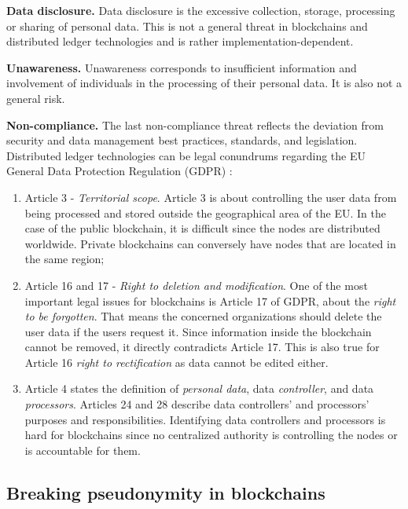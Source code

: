 \textbf{Data disclosure.} Data disclosure is the excessive collection, storage, processing or sharing of personal data.
This is not a general threat in blockchains and distributed ledger technologies and is rather implementation-dependent.

\textbf{Unawareness.} Unawareness corresponds to insufficient information and involvement of individuals in the 
processing of their personal data. It is also not a general risk.

\textbf{Non-compliance.} The last non-compliance threat reflects the deviation from security and data management best practices, 
standards, and legislation. Distributed ledger technologies can be legal conundrums regarding
 the EU General Data Protection Regulation (GDPR) \cite{EUdataregulations2018, Haque2021}:
\begin{enumerate}
    \item Article 3 - \emph{Territorial scope}. Article 3 is about
    controlling the user data from being processed and stored outside 
    the geographical area of the EU. In the case of the public blockchain, it is difficult since
    the nodes are distributed worldwide. Private blockchains can conversely have nodes 
    that are located in the same region;
    \item Article 16 and 17 - \emph{Right to deletion and modification}. 
    One of the most important legal issues for blockchains 
    is Article 17 of GDPR,
    about the \emph{right to be forgotten}. That means the concerned
    organizations should delete the user data if the users request it. 
    Since information inside the blockchain cannot be
    removed, it directly contradicts Article 17.
    This is also true for Article 16 \emph{right to rectification} as data cannot be edited either.
    \item Article 4 states the definition of \emph{personal data}, data \emph{controller},
    and data \emph{processors}. Articles 24 and
    28 describe data controllers’ and processors’ purposes and
    responsibilities. Identifying data controllers and processors is hard for blockchains since no centralized authority is
    controlling the nodes or is accountable for them.
\end{enumerate}



\subsection{Breaking pseudonymity in blockchains}
\label{ss_de_anonymisation}

